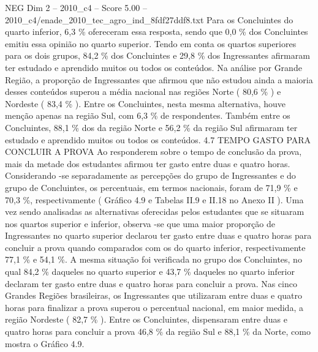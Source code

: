 \begin{textsample}{NEG Dim 2 – 2010\_c4 – Score 5.00 – 2010\_c4/enade\_2010\_tec\_agro\_ind\_8fdf27ddf8.txt}
Para os Concluintes do quarto inferior, 6,3 \% ofereceram essa resposta, sendo que 0,0 \% dos Concluintes emitiu essa opinião no quarto superior.
Tendo em conta os quartos superiores para os dois grupos, 84,2 \% dos Concluintes e 29,8 \% dos Ingressantes afirmaram ter estudado e aprendido muitos ou todos os conteúdos.
Na análise por Grande Região, a proporção de Ingressantes que afirmou que não estudou ainda a maioria desses conteúdos superou a média nacional nas regiões Norte ( 80,6 \% ) e Nordeste ( 83,4 \% ).
Entre os Concluintes, nesta mesma alternativa, houve menção apenas na região Sul, com 6,3 \% de respondentes.
Também entre os Concluintes, 88,1 \% dos da região Norte e 56,2 \% da região Sul afirmaram ter estudado e aprendido muitos ou todos os conteúdos. 4.7 TEMPO GASTO PARA CONCLUIR A PROVA Ao responderem sobre o tempo de conclusão da prova, mais da metade dos estudantes afirmou ter gasto entre duas e quatro horas.
Considerando -se separadamente as percepções do grupo de Ingressantes e do grupo de Concluintes, os percentuais, em termos nacionais, foram de 71,9 \% e 70,3 \%, respectivamente ( Gráfico 4.9 e Tabelas II.9 e II.18 no Anexo II ).
Uma vez sendo analisadas as alternativas oferecidas pelos estudantes que se situaram nos quartos superior e inferior, observa -se que uma maior proporção de Ingressantes no quarto superior declarou ter gasto entre duas e quatro horas para concluir a prova quando comparados com os do quarto inferior, respectivamente 77,1 \% e 54,1 \%.
A mesma situação foi verificada no grupo dos Concluintes, no qual 84,2 \% daqueles no quarto superior e 43,7 \% daqueles no quarto inferior declaram ter gasto entre duas e quatro horas para concluir a prova.
Nas cinco Grandes Regiões brasileiras, os Ingressantes que utilizaram entre duas e quatro horas para finalizar a prova superou o percentual nacional, em maior medida, a região Nordeste ( 82,7 \% ).
Entre os Concluintes, dispensaram entre duas e quatro horas para concluir a prova 46,8 \% da região Sul e 88,1 \% da Norte, como mostra o Gráfico 4.9.

\end{textsample}
